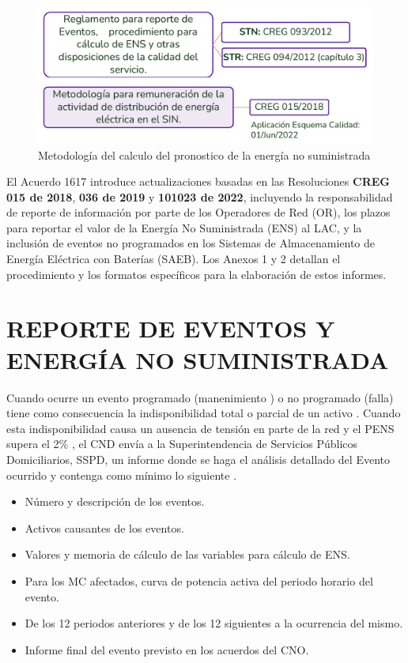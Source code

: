 \documentclass[a5paper]{book}%
\begin{document}
\begin{figure}[H]
   \centering
   \caption{Metodología del calculo del pronostico de la energía no
     suministrada}
   \label{fig:ens}
   \includegraphics[width=\linewidth]{calculo_ens.png}
 \end{figure}

El Acuerdo 1617 introduce actualizaciones basadas en las Resoluciones \textbf{CREG 015 de 2018}, \textbf{036 de 2019} y \textbf{101023 de 2022}, incluyendo la responsabilidad de reporte de información por parte de los Operadores de Red (OR), los plazos para reportar el valor de la Energía No Suministrada (ENS) al LAC, y la inclusión de eventos no programados en los Sistemas de Almacenamiento de Energía Eléctrica con Baterías (SAEB). Los Anexos 1 y 2 detallan el procedimiento y los formatos específicos para la elaboración de estos informes.

\section{REPORTE DE EVENTOS Y ENERGÍA NO SUMINISTRADA}

Cuando ocurre un evento programado (manenimiento ) o no programado (falla)  tiene como consecuencia la  indisponibilidad total o parcial  de un activo \cite{CREG0942012}. Cuando esta indisponibilidad causa un ausencia de tensión  en parte de la red y el \ac{PENS} supera el 2\% ,  el \ac{CND} envía a la Superintendencia de Servicios Públicos Domiciliarios, SSPD, un informe donde se haga el análisis detallado del Evento ocurrido y contenga como mínimo lo siguiente \cite{CREG0152018}.


 \begin{itemize}
 \item Número y descripción de los eventos.
 \item Activos causantes de los eventos.
 \item Valores y memoria de cálculo de las variables para cálculo de ENS.
 \item Para los MC afectados, curva de potencia activa del periodo horario del evento.
 \item De los 12 periodos anteriores y de los 12 siguientes a la ocurrencia del mismo.
 \item Informe final del evento previsto en los acuerdos del CNO.
 \end{itemize}
\end{document}
